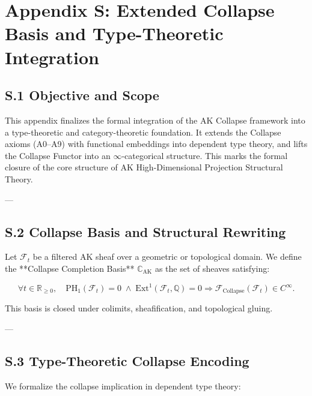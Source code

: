 \documentclass[11pt]{article}
\begin{document}

\section*{Appendix S: Extended Collapse Basis and Type-Theoretic Integration}

\subsection*{S.1 Objective and Scope}

This appendix finalizes the formal integration of the AK Collapse framework into a type-theoretic and category-theoretic foundation.  
It extends the Collapse axioms (A0–A9) with functional embeddings into dependent type theory, and lifts the Collapse Functor into an $\infty$-categorical structure.  
This marks the formal closure of the core structure of AK High-Dimensional Projection Structural Theory.

---

\subsection*{S.2 Collapse Basis and Structural Rewriting}

Let $\mathcal{F}_t$ be a filtered AK sheaf over a geometric or topological domain.  
We define the **Collapse Completion Basis** $\mathbb{C}_{\mathrm{AK}}$ as the set of sheaves satisfying:

\[
\forall t \in \mathbb{R}_{\ge 0},\quad
\mathrm{PH}_1(\mathcal{F}_t) = 0 \;\wedge\; \mathrm{Ext}^1(\mathcal{F}_t, \mathbb{Q}) = 0
\Rightarrow
\mathcal{F}_{\mathrm{Collapse}}(\mathcal{F}_t) \in C^\infty.
\]

This basis is closed under colimits, sheafification, and topological gluing.

---

\subsection*{S.3 Type-Theoretic Collapse Encoding}

We formalize the collapse implication in dependent type theory:
\end{document}
